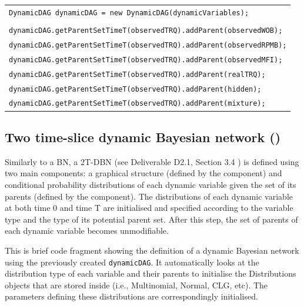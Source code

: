 \begin{table}[H]
\begin{tabular}{l} \\ \hline
        \texttt{DynamicDAG dynamicDAG = new DynamicDAG(dynamicVariables);}\\\\
        
        \texttt{dynamicDAG.getParentSetTimeT(observedTRQ).addParent(observedWOB);}\\
        \texttt{dynamicDAG.getParentSetTimeT(observedTRQ).addParent(observedRPMB);}\\
        \texttt{dynamicDAG.getParentSetTimeT(observedTRQ).addParent(observedMFI);}\\
        \texttt{dynamicDAG.getParentSetTimeT(observedTRQ).addParent(realTRQ);}\\
        \texttt{dynamicDAG.getParentSetTimeT(observedTRQ).addParent(hidden);}\\
        \texttt{dynamicDAG.getParentSetTimeT(observedTRQ).addParent(mixture);}\\  \hline 
\end{tabular}
\end{table}

\subsection{Two time-slice dynamic Bayesian network ()}

Similarly to a BN, a 2T-DBN (see Deliverable D2.1, Section 3.4 \cite{Deliverable2.1}) is defined using two main components: a graphical structure (defined by the  component) and conditional probability distributions of each dynamic variable given the set of its parents (defined by the  component). The distributions of each dynamic variable at both time 0 and time T are initialised and specified according to the variable type and the type of its potential parent set. After this step, the set of parents of each dynamic variable becomes unmodifiable.

This is brief code fragment showing the definition of a dynamic Bayesian network using the previously created \texttt{dynamicDAG}. It automatically looks at the distribution type of each variable and their parents to initialise the Distributions objects that are stored inside (i.e., Multinomial, Normal, CLG, etc). The parameters defining these distributions are correspondingly initialised.

